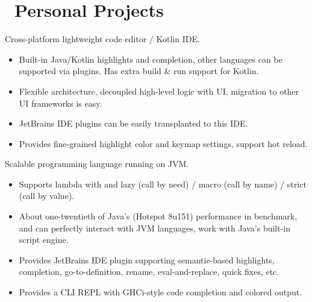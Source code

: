 \documentclass{resume}
\begin{document}
\section{\faGithubAlt\ Personal Projects}
Cross-platform lightweight code editor / Kotlin IDE.
\begin{itemize}
  \item Built-in Java/Kotlin highlights and completion, other languages can be supported via plugins. Has extra build \& run support for Kotlin.
  \item Flexible architecture, decoupled high-level logic with UI, migration to other UI frameworks is easy.
  \item JetBrains IDE plugins can be easily transplanted to this IDE.
  \item Provides fine-grained highlight color and keymap settings, support hot reload.
\end{itemize}

Scalable programming language running on JVM.
\begin{itemize}
  \item Supports lambda with and lazy (call by need) / macro (call by name) / strict (call by value).
  \item About one-twentieth of Java's (Hotspot 8u151) performance in benchmark, and can perfectly interact with JVM languages, work with Java's built-in script engine.
  \item Provides JetBrains IDE plugin supporting semantic-based highlights, completion, go-to-definition, rename, eval-and-replace, quick fixes, etc.
  \item Provides a CLI REPL with GHCi-style code completion and colored output.
\end{itemize}
\end{document}
